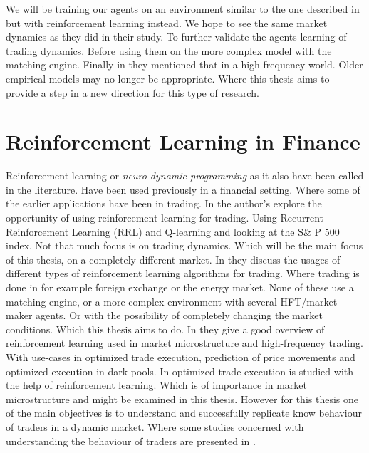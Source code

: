 \documentclass{kththesis}
\theoremstyle{definition}
\begin{document}
\newpage
We will be training our agents on an environment similar to the one described in \parencite{das2005learning} but with reinforcement learning instead. We hope to see the same market dynamics as they did in their study. To further validate the agents learning of trading dynamics. Before using them on the more complex model with the matching engine. Finally in \textcite{o2015high} they mentioned that in a high-frequency world. Older empirical models may no longer be appropriate. Where this thesis aims to provide a step in a new direction for this type of research.

\section{Reinforcement Learning in Finance}

Reinforcement learning or \textit{neuro-dynamic programming} as it also have been called in the literature. Have been used previously in a financial setting. Where some of the earlier applications have been in trading. In \textcite{moody1999reinforcement} the author's explore the opportunity of using reinforcement learning for trading. Using Recurrent Reinforcement Learning (RRL) and Q-learning and looking at the S\& P 500 index. Not that much focus is on trading dynamics. Which will be the main focus of  this thesis, on a completely different market. In \parencite{dempster2006automated, du2016algorithm, wang2016reinforcement, casqueiro2006neuro, bertoluzzo2012testing} they discuss the usages of different types of reinforcement learning algorithms for trading. Where trading is done in for example foreign exchange or the energy market. None of these use a matching engine, or a more complex environment with several HFT/market maker agents. Or with the possibility of completely changing the market conditions. Which this thesis aims to do. 
\newline
\newline
In \textcite{kearns2013machine} they give a good overview of reinforcement learning used in market microstructure and high-frequency trading. With use-cases in optimized trade execution, prediction of price movements and optimized execution in dark pools. In \parencite{nevmyvaka2006reinforcement, hendricks2014reinforcement}  optimized trade execution is studied with the help of reinforcement learning. Which is of importance in market microstructure and might be examined in this thesis. However for this thesis one of the main objectives is to understand and successfully replicate know behaviour of traders in a dynamic market. Where some studies concerned with understanding the behaviour of traders are presented in \parencite{yang2014algorithmic, yang2012behavior}. 
\end{document}
